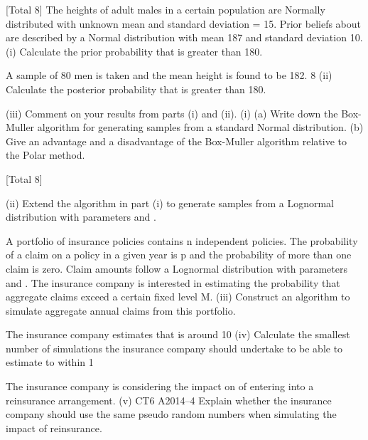 \documentclass[a4paper,12pt]{article}
\begin{document}
\begin{enumerate}

[Total 8]
The heights of adult males in a certain population are Normally distributed with
unknown mean \mu and standard deviation \sigma = 15.
Prior beliefs about \mu are described by a Normal distribution with mean 187 and
standard deviation 10.
(i)
Calculate the prior probability that \mu is greater than 180.

A sample of 80 men is taken and the mean height is found to be 182.
8
(ii) Calculate the posterior probability that \mu is greater than 180.

(iii) Comment on your results from parts (i) and (ii).
(i) (a) Write down the Box-Muller algorithm for generating samples from a
standard Normal distribution.
(b) Give an advantage and a disadvantage of the Box-Muller algorithm
relative to the Polar method.

[Total 8]

(ii)
Extend the algorithm in part (i) to generate samples from a Lognormal
distribution with parameters \mu and  .

A portfolio of insurance policies contains n independent policies. The probability of a
claim on a policy in a given year is p and the probability of more than one claim is
zero. Claim amounts follow a Lognormal distribution with parameters \mu and  . The
insurance company is interested in estimating the probability \theta that aggregate claims
exceed a certain fixed level M.
(iii)
Construct an algorithm to simulate aggregate annual claims from this
portfolio.

The insurance company estimates that \theta is around 10%
(iv)
Calculate the smallest number of simulations the insurance company should
undertake to be able to estimate \theta to within 1%

The insurance company is considering the impact on \theta of entering into a reinsurance
arrangement.
(v)
CT6 A2014–4
Explain whether the insurance company should use the same pseudo random
numbers when simulating the impact of reinsurance.



\end{enumerate}
\end{document}
